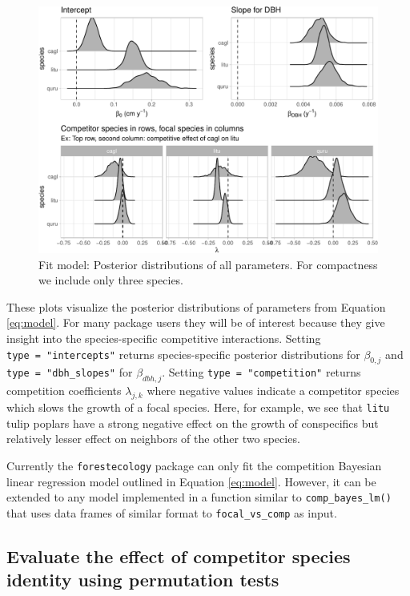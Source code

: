 \documentclass[12pt]{article}
\begin{document}
\begin{figure}

{\centering \includegraphics[width=1\linewidth]{Figures/scbi-posterior-viz-1} 

}

\caption{Fit model: Posterior distributions of all parameters. For compactness we include only three species.}\label{fig:scbi-posterior-viz}
\end{figure}

These plots visualize the posterior distributions of parameters from
Equation \ref{eq:model}. For many package users they will be of interest
because they give insight into the species-specific competitive
interactions. Setting \texttt{type\ =\ "intercepts"} returns
species-specific posterior distributions for \(\beta_{0,j}\) and
\texttt{type\ =\ "dbh\_slopes"} for \(\beta_{dbh,j}\). Setting
\texttt{type\ =\ "competition"} returns competition coefficients
\(\lambda_{j,k}\) where negative values indicate a competitor species
which slows the growth of a focal species. Here, for example, we see
that \texttt{litu} tulip poplars have a strong negative effect on the
growth of conspecifics but relatively lesser effect on neighbors of the
other two species.

Currently the \texttt{forestecology} package can only fit the
competition Bayesian linear regression model outlined in Equation
\ref{eq:model}. However, it can be extended to any model implemented in
a function similar to \texttt{comp\_bayes\_lm()} that uses data frames
of similar format to \texttt{focal\_vs\_comp} as input.

\hypertarget{evaluate-the-effect-of-competitor-species-identity-using-permutation-tests}{%
\subsection{Evaluate the effect of competitor species identity using
permutation
tests}\label{evaluate-the-effect-of-competitor-species-identity-using-permutation-tests}}
\end{document}
